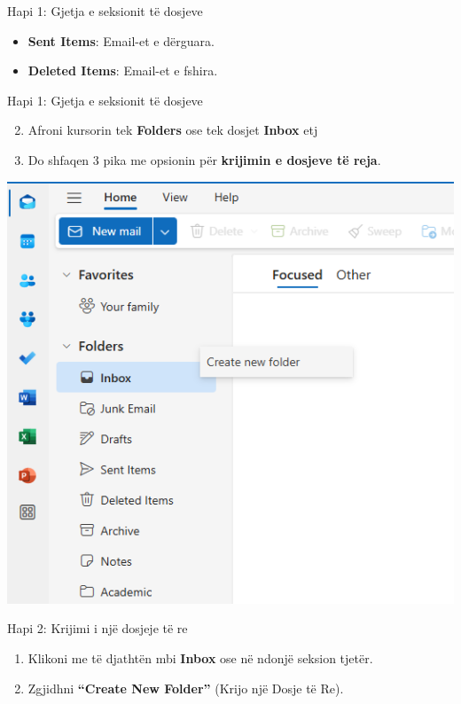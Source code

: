 \documentclass[
  ignorenonframetext,
]{beamer}
\begin{document}
\begin{frame}{Hapi 1: Gjetja e seksionit të dosjeve}
\label{hapi-1-gjetja-e-seksionit-tuxeb-dosjeve-2}
\begin{itemize}
\item
  \textbf{Sent Items}: Email-et e dërguara.
\item
  \textbf{Deleted Items}: Email-et e fshira.
\end{itemize}
\end{frame}

\begin{frame}{Hapi 1: Gjetja e seksionit të dosjeve}
\label{hapi-1-gjetja-e-seksionit-tuxeb-dosjeve-3}
\begin{enumerate}
\setcounter{enumi}{1}
\item
  Afroni kursorin tek \textbf{Folders} ose tek dosjet \textbf{Inbox} etj
\item
  Do shfaqen 3 pika me opsionin për \textbf{krijimin e dosjeve të reja}.
\end{enumerate}

\includegraphics{./images/outlook12.png}
\end{frame}

\begin{frame}{Hapi 2: Krijimi i një dosjeje të re}
\label{hapi-2-krijimi-i-njuxeb-dosjeje-tuxeb-re}
\begin{enumerate}
\item
  Klikoni me të djathtën mbi \textbf{Inbox} ose në ndonjë seksion
  tjetër.
\item
  Zgjidhni \textbf{``Create New Folder''} (Krijo një Dosje të Re).
\end{enumerate}
\end{frame}
\end{document}
